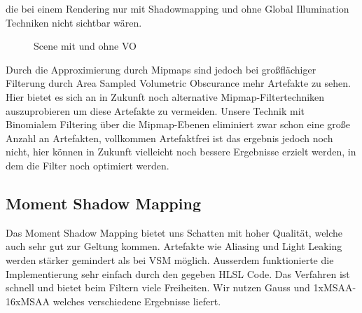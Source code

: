 \documentclass[runningheaders,a4paper]{llncs}
\begin{document}
die bei einem Rendering nur mit Shadowmapping und ohne Global Illumination Techniken nicht sichtbar wären.
\begin{figure}[H]
	\centering
	\quad\quad
	\centering
	\caption{Scene mit und ohne VO}
	\label{ref:finalVO}
\end{figure}
Durch die Approximierung durch Mipmaps sind jedoch bei
großflächiger Filterung durch Area Sampled Volumetric Obscurance mehr Artefakte zu sehen. Hier bietet es sich an in Zukunft noch alternative
Mipmap-Filtertechniken auszuprobieren um diese Artefakte zu vermeiden. Unsere Technik mit Binomialem
Filtering über die Mipmap-Ebenen eliminiert zwar schon eine große Anzahl an Artefakten, vollkommen
Artefaktfrei ist das ergebnis jedoch noch nicht, hier können in Zukunft vielleicht noch bessere Ergebnisse
erzielt werden, in dem die Filter noch optimiert werden.

\subsection{Moment Shadow Mapping}
Das Moment Shadow Mapping bietet uns Schatten mit hoher Qualität, welche auch sehr gut zur Geltung kommen. Artefakte wie Aliasing und Light Leaking werden stärker gemindert als bei VSM möglich. Ausserdem funktionierte die Implementierung sehr einfach durch den gegeben HLSL Code. Das Verfahren ist schnell und bietet beim Filtern viele Freiheiten. Wir nutzen Gauss und 1xMSAA-16xMSAA welches verschiedene Ergebnisse liefert.
\end{document}
